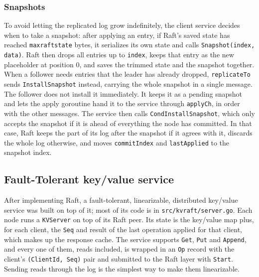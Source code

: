 \documentclass[conference]{IEEEtran}
\begin{document}
\subsubsection{\textbf{Snapshots}} To avoid letting the replicated log grow indefinitely, the client service decides when to take a snapshot: after applying an entry, if Raft's saved state has reached \texttt{maxraftstate} bytes, it serializes its own state and calls \texttt{Snapshot(index, data)}. Raft then drops all entries up to \texttt{index}, keeps that entry as the new placeholder at position 0, and saves the trimmed state and the snapshot together. When a follower needs entries that the leader has already dropped, \texttt{replicateTo} sends \texttt{InstallSnapshot} instead, carrying the whole snapshot in a single message. The follower does not install it immediately. It keeps it as a pending snapshot and lets the apply goroutine hand it to the service through \texttt{applyCh}, in order with the other messages. The service then calls \texttt{CondInstallSnapshot}, which only accepts the snapshot if it is ahead of everything the node has committed. In that case, Raft keeps the part of its log after the snapshot if it agrees with it, discards the whole log otherwise, and moves \texttt{commitIndex} and \texttt{lastApplied} to the snapshot index.

\subsection{Fault-Tolerant key/value service}
\label{sec:algs-kv}
After implementing Raft, a fault-tolerant, linearizable, distributed key/value service was built on top of it; most of its code is in \texttt{src/kvraft/server.go}. Each node runs a \texttt{KVServer} on top of its Raft peer. Its state is the key/value map plus, for each client, the \texttt{Seq} and result of the last operation applied for that client, which makes up the response cache. The service supports \texttt{Get}, \texttt{Put} and \texttt{Append}, and every one of them, reads included, is wrapped in an \texttt{Op} record with the client's \texttt{(ClientId, Seq)} pair and submitted to the Raft layer with \texttt{Start}. Sending reads through the log is the simplest way to make them linearizable.
\end{document}
